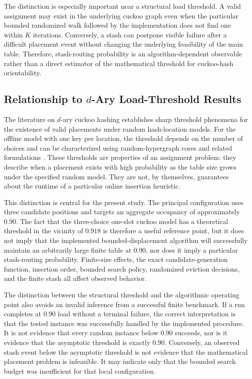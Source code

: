 \documentclass[conference]{IEEEtran}
\begin{document}
The distinction is especially important near a structural load threshold. A
valid assignment may exist in the underlying cuckoo graph even when the
particular bounded randomized walk followed by the implementation does not
find one within $K$ iterations. Conversely, a stash can postpone visible
failure after a difficult placement event without changing the underlying
feasibility of the main table. Therefore, stash-routing probability is an
algorithm-dependent observable rather than a direct estimator of the
mathematical threshold for cuckoo-hash orientability.

\subsection{Relationship to $d$-Ary Load-Threshold Results}
\label{subsec:discussion_thresholds}

The literature on $d$-ary cuckoo hashing establishes sharp threshold
phenomena for the existence of valid placements under random hash-location
models. For the offline model with one key per location, the threshold depends
on the number of choices and can be characterized using random-hypergraph
cores and related formulations \cite{dietzfelbinger2009tight,fountoulakis2012sharp}.
These thresholds are properties of an assignment problem: they describe when
a placement exists with high probability as the table size grows under the
specified random model. They are not, by themselves, guarantees about the
runtime of a particular online insertion heuristic.

This distinction is central for the present study. The principal configuration
uses three candidate positions and targets an aggregate occupancy of
approximately $0.90$. The fact that the three-choice one-slot cuckoo model has
a theoretical threshold in the vicinity of $0.918$ is therefore a useful
reference point, but it does not imply that the implemented bounded-displacement
algorithm will successfully maintain an arbitrarily large finite table at
$0.90$, nor does it imply a particular stash-routing probability. Finite-size
effects, the exact candidate-generation function, insertion order, bounded
search policy, randomized eviction decisions, and the finite stash all affect
observed behavior.

The distinction between the structural threshold and the algorithmic operating
point also avoids an invalid inference from a successful finite benchmark. If
a run completes at $0.90$ load without a terminal failure, the correct
interpretation is that the tested instance was successfully handled by the
implemented procedure. It is not evidence that every random instance below
$0.90$ succeeds, nor is it evidence that the asymptotic threshold is exactly
$0.90$. Conversely, an observed stash event below the asymptotic threshold is
not evidence that the mathematical placement problem is infeasible. It may
indicate only that the bounded search budget was insufficient for that local
configuration.
\end{document}
